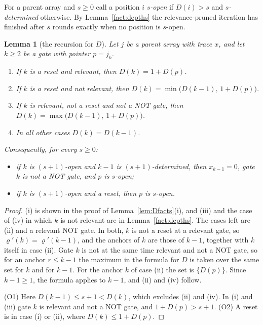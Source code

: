 \documentclass[11pt]{amsart}
\newtheorem{lemma}[theorem]{Lemma}
\theoremstyle{definition}
\theoremstyle{remark}
\begin{document}
For a parent array and $s\ge0$ call a position $i$ \emph{$s$-open} if $D(i)>s$ and
\emph{$s$-determined} otherwise. By Lemma~\ref{fact:depths} the relevance-pruned iteration has
finished after $s$ rounds exactly when no position is $s$-open.

\begin{lemma}[the recursion for $D$]\label{lem:status}
Let $j$ be a parent array with trace $x$, and let $k\ge2$ be a gate with pointer $p=j_k$.
\begin{enumerate}[label=(\roman*),leftmargin=2.4em]
\item If $k$ is a reset and relevant, then $D(k)=1+D(p)$.
\item If $k$ is a reset and not relevant, then $D(k)=\min\bigl(D(k-1),\,1+D(p)\bigr)$.
\item If $k$ is relevant, not a reset and not a NOT gate, then $D(k)=\max\bigl(D(k-1),\,1+D(p)\bigr)$.
\item In all other cases $D(k)=D(k-1)$.
\end{enumerate}
Consequently, for every $s\ge0$:
\begin{itemize}[leftmargin=3.2em]
\item[(O1)] if $k$ is $(s+1)$-open and $k-1$ is $(s+1)$-determined, then $x_{k-1}=0$, gate $k$ is
not a NOT gate, and $p$ is $s$-open;
\item[(O2)] if $k$ is $(s+1)$-open and a reset, then $p$ is $s$-open.
\end{itemize}
\end{lemma}

\begin{proof}
(i) is shown in the proof of Lemma~\ref{lem:Dfacts}(i), and (iii) and the case of (iv) in which
$k$ is not relevant are in Lemma~\ref{fact:depths}. The cases left are (ii) and a relevant NOT
gate. In both, $k$ is not a reset at a relevant gate, so $\varrho'(k)=\varrho'(k-1)$, and the
anchors of $k$ are those of $k-1$, together with $k$ itself in case (ii). Gate $k$ is not at the
same time relevant and not a NOT gate, so for an anchor $r\le k-1$ the maximum in the formula for
$D$ is taken over the same set for $k$ and for $k-1$. For the anchor $k$ of case (ii) the set is
$\{D(p)\}$. Since $k-1\ge1$, the formula applies to $k-1$, and (ii) and (iv) follow.

(O1) Here $D(k-1)\le s+1<D(k)$, which excludes (ii) and (iv). In (i) and (iii) gate $k$ is
relevant and not a NOT gate, and $1+D(p)>s+1$. (O2) A reset is in case (i) or (ii), where
$D(k)\le1+D(p)$.
\end{proof}
\end{document}
